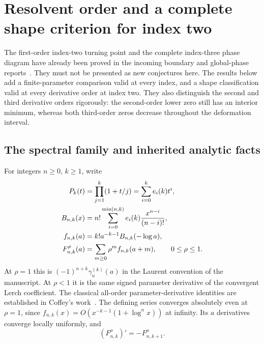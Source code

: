 
\section{Resolvent order and a complete shape criterion for index two}
\label{lershape:sec:main}

The first-order index-two turning point and the complete index-three
phase diagram have already been proved in the incoming boundary and
global-phase reports~\cite{lershape:Boundary,lershape:Globalphase}.
They must not be presented as new conjectures here.
The results below add a finite-parameter comparison valid at every index,
and a shape classification valid at every derivative order at index two.
They also distinguish the second and third derivative orders rigorously:
the second-order lower zero still has an interior minimum, whereas both
third-order zeros decrease throughout the deformation interval.

\subsection{The spectral family and inherited analytic facts}

For integers $n\geq0$, $k\geq1$, write
\begin{align}
 P_k(t)&=\prod_{j=1}^k(1+t/j)=\sum_{i=0}^k e_i(k)t^i,\notag\\
 B_{n,k}(x)&=n!\sum_{i=0}^{\min(n,k)}e_i(k)\frac{x^{n-i}}{(n-i)!},\notag\\
 f_{n,k}(a)&=k!a^{-k-1}B_{n,k}(-\log a),\label{lershape:eq:elementary}\\
 F_{n,k}^{\rho}(a)&=\sum_{m\geq0}\rho^m f_{n,k}(a+m),
 \qquad 0\leq\rho\leq1.\label{lershape:eq:spectral}
\end{align}
At $\rho=1$ this is $(-1)^{n+k}\gamma_n^{(k)}(a)$ in the
Laurent convention of the manuscript. At $\rho<1$ it is the same signed
parameter derivative of the convergent Lerch coefficient. The classical
all-order parameter-derivative identities are established in
Coffey's work~\cite{lershape:Coffey}. The defining
series converges absolutely even at $\rho=1$, since
$f_{n,k}(x)=O(x^{-k-1}(1+\log^n x))$ at infinity. Its $a$ derivatives
converge locally uniformly, and
\begin{equation}\label{lershape:eq:a-derivative}
 (F_{n,k}^{\rho})'=-F_{n,k+1}^{\rho}.
\end{equation}

